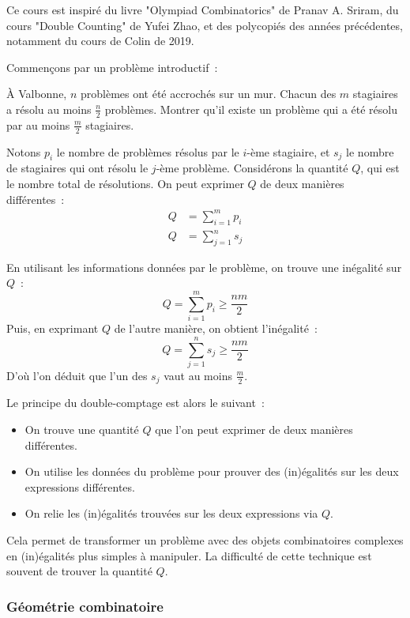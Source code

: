 Ce cours est inspiré du livre "Olympiad Combinatorics" de Pranav A. Sriram, du cours "Double Counting" de Yufei Zhao, et des polycopiés des années précédentes, notamment du cours de Colin de 2019.

Commençons par un problème introductif~:
\begin{exo}
À Valbonne, $n$ problèmes ont été accrochés sur un mur. Chacun des $m$ stagiaires a résolu au moins $\frac{n}2$ problèmes. Montrer qu'il existe un problème qui a été résolu par au moins $\frac{m}2$ stagiaires.
\end{exo}


\begin{sol}
Notons $p_i$ le nombre de problèmes résolus par le $i$-ème stagiaire, et $s_j$ le nombre de stagiaires qui ont résolu le $j$-ème problème.
Considérons la quantité $Q$, qui est le nombre total de résolutions.
On peut exprimer $Q$ de deux manières différentes~:
\begin{align*}
  Q &= \sum_{i = 1}^m p_i \\
  Q &= \sum_{j = 1}^n s_j
\end{align*}

En utilisant les informations données par le problème, on trouve une inégalité sur $Q$~:
$$Q = \sum_{i = 1}^m p_i \ge \frac{nm}2$$
Puis, en exprimant $Q$ de l'autre manière, on obtient l'inégalité~:
$$Q = \sum_{j = 1}^n s_j \ge \frac{nm}2$$
D'où l'on déduit que l'un des $s_j$ vaut au moins $\frac{m}2$.
\end{sol}

Le principe du double-comptage est alors le suivant~:
\begin{itemize}
\item On trouve une quantité $Q$ que l'on peut exprimer de deux manières différentes.
\item On utilise les données du problème pour prouver des (in)égalités sur les deux expressions différentes.
\item On relie les (in)égalités trouvées sur les deux expressions via $Q$.
\end{itemize}
Cela permet de transformer un problème avec des objets combinatoires complexes en (in)égalités plus simples à manipuler. La difficulté de cette technique est souvent de trouver la quantité $Q$.


\subsubsection{Géométrie combinatoire}

